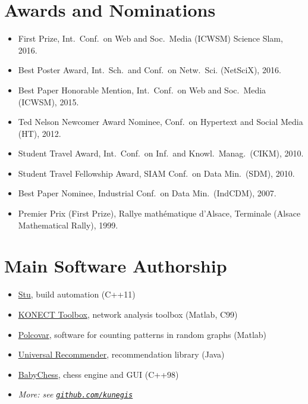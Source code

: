 \documentclass[line,mm]{res}
\newcounter{x}
\begin{document}
\begin{resume}
\section{Awards and Nominations}
\begin{itemize}
  \item
    First Prize, Int.\ Conf.\ on Web and Soc.\ Media (ICWSM) Science Slam, 2016. 
  \item Best Poster Award, Int.\ Sch.\ and Conf.\ on Netw.\ Sci.
    (NetSciX), 2016. 
  \item Best Paper Honorable Mention, Int.\ Conf.\ on Web and Soc.\ Media (ICWSM), 2015.  
  \item Ted Nelson Newcomer Award Nominee, Conf.\ on Hypertext and
    Social Media (HT), 2012.   
  \item Student Travel Award, Int.\ Conf.\ on Inf.\ and Knowl.\ Manag.\ (CIKM), 2010. 
  \item Student Travel Fellowship Award, SIAM Conf.\ on Data Min.\ (SDM),
    2010.  
  \item Best Paper Nominee, Industrial Conf.\ on Data Min.\ (IndCDM), 2007.    
  \item Premier Prix (First Prize), Rallye mathématique d'Alsace, Terminale (Alsace Mathematical Rally), 1999. 
\end{itemize}

\section{Main Software Authorship}
\begin{itemize}
  \item \href{https://github.com/kunegis/stu}{Stu}, build automation (C++11)
  \item \href{https://github.com/kunegis/konect-toolbox}{KONECT Toolbox}, network analysis toolbox (Matlab, C99)
  \item \href{https://west.uni-koblenz.de/Research/systems/polcovar}{Polcovar}, software for counting patterns in random graphs (Matlab)
  \item \href{https://github.com/kunegis/universal-recommender}{Universal Recommender}, recommendation library (Java)
  \item \href{https://github.com/kunegis/babychess}{BabyChess}, chess engine and GUI (C++98)
  \item \emph{More:  see {\tt \href{https://github.com/kunegis}{github.com/kunegis}}}
\end{itemize}


\end{resume}
\end{document}
